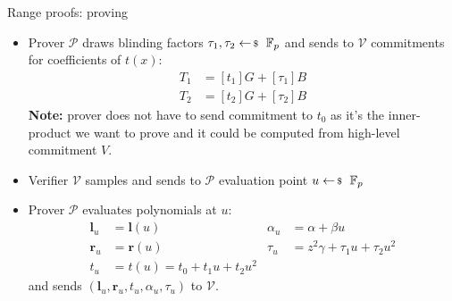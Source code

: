 \documentclass{zkdl-presentation-template}
\begin{document}
    \begin{frame}{Range proofs: proving}
        \begin{itemize}
            \item Prover $\mathcal{P}$ draws blinding factors $\tau_1, \tau_2 \leftarrowS \mathbb{F}_p$ and sends to $\mathcal{V}$ commitments for coefficients of $t(x)$:
                \begin{equation*}
                    \begin{aligned}
                        T_1 &= [t_1]G + [\tau_1]B \\
                        T_2 &= [t_2]G + [\tau_2]B
                    \end{aligned}
                \end{equation*}
                \textbf{Note:} prover does not have to send commitment to $t_0$ as it's the inner-product we want to prove and it could be computed from high-level commitment $V$.\pause
            \item Verifier $\mathcal{V}$ samples and sends to $\mathcal{P}$ evaluation point $u \leftarrowS \mathbb{F}_p$\pause
            \item Prover $\mathcal{P}$ evaluates polynomials at $u$:
            \begin{equation*}
                \begin{aligned}
                    \mathbf{l}_u & = \mathbf{l}(u) & \alpha_u &= \alpha + \beta u\\
                    \mathbf{r}_u &= \mathbf{r}(u) & \tau_u &= z^2\gamma + \tau_1 u + \tau_2 u^2\\
                    t_u &= t(u) = t_0 + t_1u + t_2u^2 &
                \end{aligned}
            \end{equation*}
            and sends $(\mathbf{l}_u, \mathbf{r}_u, t_u, \alpha_u, \tau_u)$ to $\mathcal{V}$.
        \end{itemize}
    \end{frame}
\end{document}
